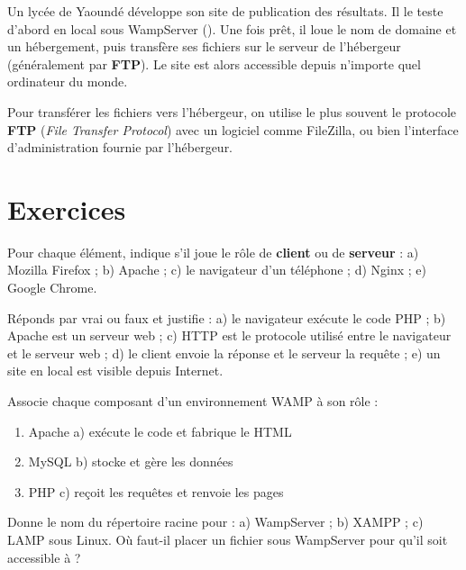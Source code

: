 \begin{exemple}
Un lycée de Yaoundé développe son site de publication des résultats. Il le teste
d'abord en local sous WampServer (). Une fois prêt,
il loue le nom de domaine  et un hébergement, puis transfère
ses fichiers  sur le serveur de l'hébergeur (généralement par \textbf{FTP}).
Le site est alors accessible depuis n'importe quel ordinateur du monde.
\end{exemple}

\begin{remarque}
Pour transférer les fichiers vers l'hébergeur, on utilise le plus souvent le protocole
\textbf{FTP} (\emph{File Transfer Protocol}) avec un logiciel comme FileZilla, ou bien
l'interface d'administration fournie par l'hébergeur.
\end{remarque}

\section{Exercices}


Pour chaque élément, indique s'il joue le rôle de \textbf{client} ou de
\textbf{serveur} : a) Mozilla Firefox ; b) Apache ; c) le navigateur d'un téléphone ;
d) Nginx ; e) Google Chrome.

Réponds par vrai ou faux et justifie : a) le navigateur exécute le code PHP ;
b) Apache est un serveur web ; c) HTTP est le protocole utilisé entre le navigateur
et le serveur web ; d) le client envoie la réponse et le serveur la requête ;
e) un site en local est visible depuis Internet.

Associe chaque composant d'un environnement WAMP à son rôle :
\begin{enumerate}[label=\arabic*)]
  \item Apache \qquad a) exécute le code et fabrique le HTML
  \item MySQL  \qquad b) stocke et gère les données
  \item PHP    \qquad c) reçoit les requêtes et renvoie les pages
\end{enumerate}

Donne le nom du répertoire racine pour : a) WampServer ; b) XAMPP ; c) LAMP sous
Linux. Où faut-il placer un fichier  sous WampServer pour qu'il soit
accessible à  ?

